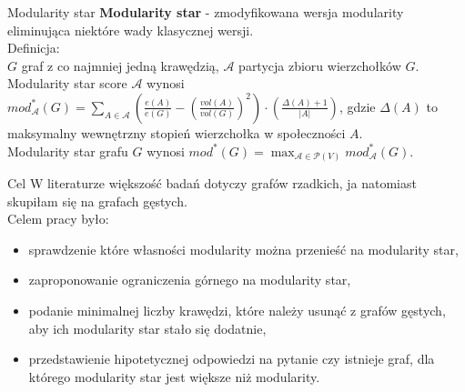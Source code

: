 \documentclass{beamer}
\begin{document}
\begin{frame}{Modularity star}
    \textbf{Modularity star} - zmodyfikowana wersja modularity eliminująca niektóre wady klasycznej wersji.\\
    \vspace{0.5cm}
    Definicja:\\
    \vspace{0.2cm}
    \(G\) graf z co najmniej jedną krawędzią, \(\mathcal{A}\) partycja zbioru wierzchołków \(G\).\\
    \vspace{0.4cm}
    Modularity star score \(\mathcal{A}\) wynosi \(mod^*_{\mathcal{A}}(G) = \sum_{A \in \mathcal{A}} \left(\frac{e(A)}{e(G)} - {\left(\frac{vol(A)}{vol(G)}\right)}^2\right) \cdot \left(\frac{\Delta(A) + 1}{|A|}\right)\), gdzie \(\Delta(A)\) to maksymalny wewnętrzny stopień wierzchołka w społeczności \(A\).\\
    \vspace{0.4cm}
    Modularity star grafu \(G\) wynosi \(mod^*(G) = \max_{\mathcal{A} \in \mathcal{P}(V)} mod^*_{\mathcal{A}}(G).\)\\
\end{frame}

\begin{frame}{Cel}
    W literaturze większość badań dotyczy grafów rzadkich, ja natomiast skupiłam się na grafach gęstych.\\
    \vspace{0.2cm}
    Celem pracy było:
    \begin{itemize}
        \item sprawdzenie które własności modularity można przenieść na modularity star,
        \item zaproponowanie ograniczenia górnego na modularity star,
        \item podanie minimalnej liczby krawędzi, które należy usunąć z grafów gęstych, aby ich modularity star stało się dodatnie,
        \item przedstawienie hipotetycznej odpowiedzi na pytanie czy istnieje graf, dla którego modularity star jest większe niż modularity.\\
    \end{itemize}
\end{frame}
\end{document}
